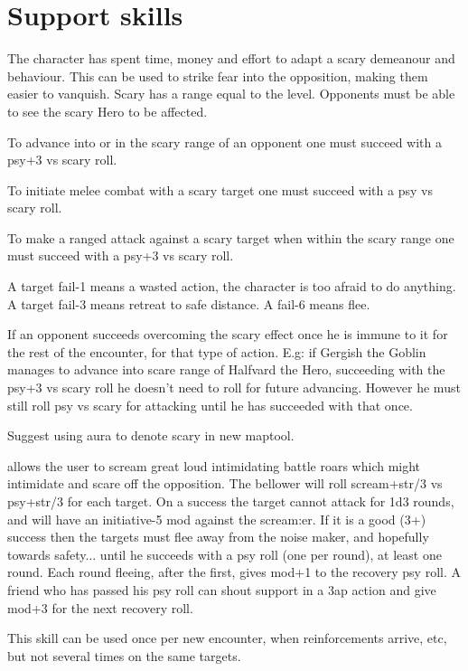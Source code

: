 \section*{Support skills}

\openskillslist


 The character has spent time, money and effort to adapt a scary demeanour and behaviour. This can be used to strike fear into the opposition, making them easier to vanquish. Scary has a range equal to the level. Opponents must be able to see the scary Hero to be affected.

To advance into or in the scary range of an opponent one must succeed with a psy+3 vs scary roll.

To initiate melee combat with a scary target one must succeed with a psy vs scary roll.

To make a ranged attack against a scary target when within the scary range one must succeed with a psy+3 vs scary roll.

A target fail-1 means a wasted action, the character is too afraid to do anything. A target fail-3 means retreat to safe distance. A fail-6 means flee.

If an opponent succeeds overcoming the scary effect once he is immune to it for the rest of the encounter, for that type of action. E.g: if Gergish the Goblin manages to advance into scare range of Halfvard the Hero, succeeding with the psy+3 vs scary roll he doesn't need to roll for future advancing. However he must still roll psy vs scary for attacking until he has succeeded with that once.

Suggest using aura to denote scary in new maptool.


 allows the user to scream great loud intimidating battle roars which might intimidate and scare off the opposition. The bellower will roll scream+str/3 vs psy+str/3 for each target. On a success the target cannot attack for 1d3 rounds, and will have an initiative-5 mod against the scream:er. If it is a good (3+) success then the targets must flee away from the noise maker, and hopefully towards safety... until he succeeds with a psy roll (one per round), at least one round. Each round fleeing, after the first, gives mod+1 to the recovery psy roll. A friend who has passed his psy roll can shout support in a 3ap action and give mod+3 for the next recovery roll.

This skill can be used once per new encounter, when reinforcements arrive, etc, but not several times on the same targets.

